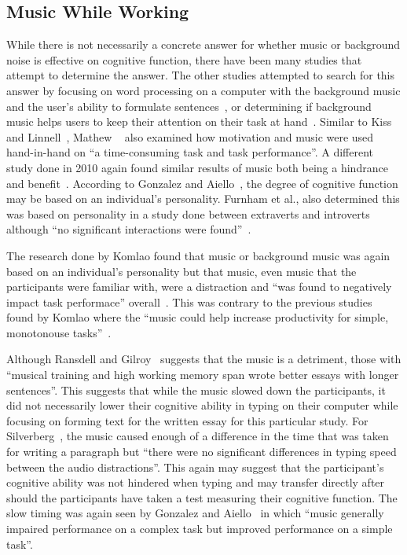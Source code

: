 \documentclass[manuscript, screen, review]{acmart} %
\begin{document}
\subsection{Music While Working}  %
While there is not necessarily a concrete answer for whether music or background noise is effective on cognitive function, there have been many
studies that attempt to determine the answer. 
The other studies attempted to search for this answer by focusing on word processing on a computer with the background music and the user's ability to formulate sentences~\cite{ransdell2001141}, or determining if background music helps users to keep their attention on their task at hand~\cite{kiss2021effect}. 
Similar to Kiss and Linnell~\cite{kiss2021effect}, Mathew ~\cite{mathew2022inherently} also examined how motivation and music were used hand-in-hand on ``a time-consuming task and task performance''. 
A different study done in 2010 again found similar results of music both being a hindrance and benefit~\cite{AudioDistractionsAshley}. 
According to Gonzalez and Aiello~\cite{Gonzalez_Aiello_2019}, the degree of cognitive function may be based on an individual's personality. 
Furnham et al., also determined this was based on personality in a study done between extraverts and introverts although ``no significant interactions were found''~\cite{distractingEffectsFurnham}.

The research done by Komlao found that music or background music was again based on an individual's personality but that music, even music that the participants were familiar with, were a distraction and ``was found to negatively impact task performace'' overall~\cite{komlao2018variations}.
This was contrary to the previous studies found by Komlao where the ``music could help increase productivity for simple, monotonouse tasks''~\cite{komlao2018variations}.

Although Ransdell and Gilroy~\cite{ransdell2001141} suggests that the music is a detriment, those with ``musical training and high working memory span wrote better essays with longer sentences''. 
This suggests that while the music slowed down the participants, it did not necessarily lower their cognitive ability in typing on their computer while focusing on forming text for the written essay for this particular study. 
For Silverberg~\cite{AudioDistractionsAshley}, the music caused enough of a difference in the time that was taken for writing a paragraph but ``there were no significant differences in typing speed between the audio distractions''. 
This again may suggest that the participant's cognitive ability was not hindered when typing and may transfer directly after should the participants have taken a test measuring their cognitive function. 
The slow timing was again seen by Gonzalez and Aiello~\cite{Gonzalez_Aiello_2019} in which ``music generally impaired performance on a complex task but improved performance on a simple task''. 
\end{document}

